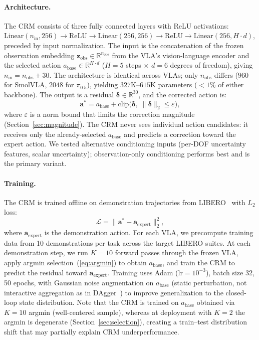\paragraph{Architecture.}
The CRM consists of three fully connected layers with ReLU activations: $\mathrm{Linear}(n_{\mathrm{in}}, 256) \to \mathrm{ReLU} \to \mathrm{Linear}(256, 256) \to \mathrm{ReLU} \to \mathrm{Linear}(256, H{\cdot}d)$, preceded by input normalization. The input is the concatenation of the frozen observation embedding $\mathbf{z}_{\mathrm{obs}} \in \mathbb{R}^{n_{\mathrm{obs}}}$ from the VLA's vision-language encoder and the selected action $a_{\mathrm{base}} \in \mathbb{R}^{H \cdot d}$ ($H{=}5$ steps $\times$ $d{=}6$ degrees of freedom), giving $n_{\mathrm{in}} = n_{\mathrm{obs}} + 30$. The architecture is identical across VLAs; only $n_{\mathrm{obs}}$ differs ($960$ for SmolVLA, $2048$ for $\pi_{0.5}$), yielding $327$K--$615$K parameters ($<\!1$\% of either backbone). The output is a residual $\boldsymbol{\delta} \in \mathbb{R}^{30}$, and the corrected action is:
\begin{equation}
  \mathbf{a}^* = a_{\mathrm{base}} + \mathrm{clip}\bigl(\boldsymbol{\delta},\; \|\boldsymbol{\delta}\|_2 \leq \varepsilon\bigr),
  \label{eq:crm}
\end{equation}
where $\varepsilon$ is a norm bound that limits the correction magnitude (Section~\ref{sec:magnitude}). The CRM never sees individual action candidates: it receives only the already-selected $a_{\mathrm{base}}$ and predicts a correction toward the expert action. We tested alternative conditioning inputs (per-DOF uncertainty features, scalar uncertainty); observation-only conditioning performs best and is the primary variant.

\paragraph{Training.}
The CRM is trained offline on demonstration trajectories from LIBERO~\cite{liu2023libero} with $L_2$ loss:
\begin{equation}
  \mathcal{L} = \bigl\|\mathbf{a}^* - \mathbf{a}_{\mathrm{expert}}\bigr\|_2^2,
  \label{eq:loss}
\end{equation}
where $\mathbf{a}_{\mathrm{expert}}$ is the demonstration action. For each VLA, we precompute training data from 10 demonstrations per task across the target LIBERO suites. At each demonstration step, we run $K{=}10$ forward passes through the frozen VLA, apply argmin selection~(\ref{eq:argmin}) to obtain $a_{\mathrm{base}}$, and train the CRM to predict the residual toward $\mathbf{a}_{\mathrm{expert}}$. Training uses Adam ($\mathrm{lr}{=}10^{-3}$), batch size 32, 50 epochs, with Gaussian noise augmentation on $a_{\mathrm{base}}$ (static perturbation, not interactive aggregation as in DAgger~\cite{ross2011dagger}) to improve generalization to the closed-loop state distribution. Note that the CRM is trained on $a_{\mathrm{base}}$ obtained via $K{=}10$ argmin (well-centered sample), whereas at deployment with $K{=}2$ the argmin is degenerate (Section~\ref{sec:selection}), creating a train--test distribution shift that may partially explain CRM underperformance.

